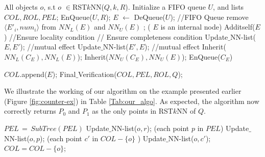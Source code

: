 \documentclass[prodmode,letterpaper]{acmsmall}
\newcommand{\rstknn}{RST$k$NN\xspace}
\begin{document}
\begin{spacing}{0.8}
\begin{algorithm}[tp]
\caption{\rstknn($R$: IUR-Tree root,$Q$: query)}
\begin{algorithmic}[1]
 All objects $o$, s.t $o$ $\in$RST$k$NN($Q,k,R$).
\State Initialize a FIFO queue $U$, and lists $COL, ROL, PEL$;
\State EnQueue($U,R$);
	\State $E$ $\leftarrow$ DeQueue($U$); //FIFO Queue
			\State remove $\langle E'_i,num_i \rangle$ from
			$NN_L(E)$ and $NN_U(E)$ ;
		\EndIf
	\EndFor
	\If( $E$ is an internal node)
		\State Additself($E$)				//Ensure locality condition
	\EndIf	
	   // Ensure completeness condition   
		\State Update$\_$NN-list($E,E'$); //mutual effect
		\State Update$\_$NN-list($E',E$); //mutual effect
	\EndFor
				\State Inherit($NN_L(C_E),NN_L(E)$);
				\State Inherit($NN_U(C_E),NN_U(E)$);
				\State EnQueue($C_E$)				
			\EndFor
			
		\Else
			\State $COL$.append($E$); 
		\EndIf
	\EndIf
\EndWhile
\State Final$\_$Verification($COL,PEL,ROL,Q$);
\end{algorithmic}
\end{algorithm}
\end{spacing} 
We illustrate the working of our algorithm on the example presented
earlier (Figure \ref{fig:counter-ex}) in
Table \ref{Tab:our_algo}. As expected, the algorithm now correctly returns $P_0$ and $P_1$
as the only points in \rstknn of $Q$.

\begin{spacing}{0.8}
\begin{algorithm}[tp]
\begin{algorithmic}[1]
\State $PEL\, =\, SubTree(PEL)$
			\State Update$\_$NN-list($o,r$); 
		\EndFor
		\For(each point $p$ in $PEL$)
			\State Update$\_$NN-list($o,p$); 
		\EndFor
		\For(each point $c'$ in $COL -\lbrace o \rbrace$ )
			\State Update$\_$NN-list($o,c'$); 
		\EndFor				
			\State $COL=COL- \lbrace o \rbrace$;
		\EndIf
	\EndFor
\EndWhile
\EndFunction
\end{algorithmic}
\end{algorithm}
\end{spacing}
\end{document}
